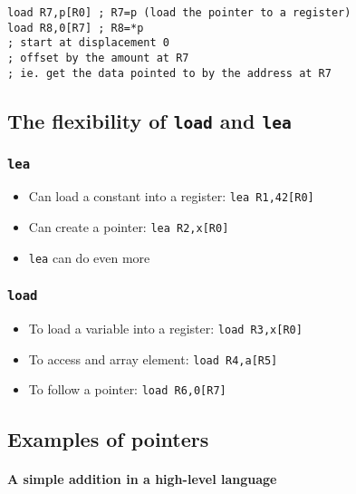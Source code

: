 \begin{verbatim}
load R7,p[R0] ; R7=p (load the pointer to a register)
load R8,0[R7] ; R8=*p
; start at displacement 0
; offset by the amount at R7
; ie. get the data pointed to by the address at R7
\end{verbatim}

\subsection[The flexibility of LOAD and LEA]{The flexibility of \texttt{load} and \texttt{lea}}\label{sub:the_flexibility_of_load_and_lea}

\subsubsection[LEA]{\texttt{lea}}\label{ssub:lea}

\begin{itemize}
	\item Can load a constant into a register: \texttt{lea R1,42[R0]}
	\item Can create a pointer: \texttt{lea R2,x[R0]}
	\item \texttt{lea} can do even more
\end{itemize}

\subsubsection[LOAD]{\texttt{load}}\label{ssub:load}

\begin{itemize}
	\item To load a variable into a register: \texttt{load R3,x[R0]}
	\item To access and array element: \texttt{load R4,a[R5]}
	\item To follow a pointer: \texttt{load R6,0[R7]}
\end{itemize}

\subsection{Examples of pointers}\label{sub:examples_of_pointers}

\paragraph{A simple addition in a high-level language}\label{par:a_simple_addition_in_a_high_level_language}

